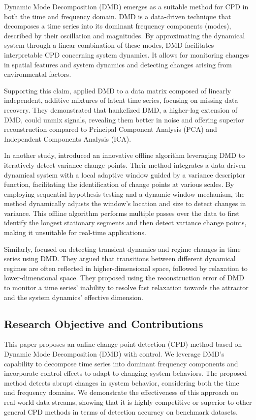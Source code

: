 Dynamic Mode Decomposition (DMD) emerges as a suitable method for CPD in both the time and frequency domain. DMD is a data-driven technique that decomposes a time series into its dominant frequency components (modes), described by their oscillation and magnitudes. By approximating the dynamical system through a linear combination of these modes, DMD facilitates interpretable CPD concerning system dynamics. It allows for monitoring changes in spatial features and system dynamics and detecting changes arising from environmental factors.

Supporting this claim, \citet{Prasadan2020} applied DMD to a data matrix composed of linearly independent, additive mixtures of latent time series, focusing on missing data recovery. They demonstrated that hankelized DMD, a higher-lag extension of DMD, could unmix signals, revealing them better in noise and offering superior reconstruction compared to Principal Component Analysis (PCA) and Independent Components Analysis (ICA).

In another study, \citet{Srivastava2017} introduced an innovative offline algorithm leveraging DMD to iteratively detect variance change points. Their method integrates a data-driven dynamical system with a local adaptive window guided by a variance descriptor function, facilitating the identification of change points at various scales. By employing sequential hypothesis testing and a dynamic window mechanism, the method dynamically adjusts the window's location and size to detect changes in variance. This offline algorithm performs multiple passes over the data to first identify the longest stationary segments and then detect variance change points, making it unsuitable for real-time applications.

Similarly, \citet{Gottwald2020} focused on detecting transient dynamics and regime changes in time series using DMD. They argued that transitions between different dynamical regimes are often reflected in higher-dimensional space, followed by relaxation to lower-dimensional space. They proposed using the reconstruction error of DMD to monitor a time series' inability to resolve fast relaxation towards the attractor and the system dynamics' effective dimension.

\subsection{Research Objective and Contributions}
This paper proposes an online change-point detection (CPD) method based on Dynamic Mode Decomposition (DMD) with control. We leverage DMD's capability to decompose time series into dominant frequency components and incorporate control effects to adapt to changing system behaviors. The proposed method detects abrupt changes in system behavior, considering both the time and frequency domains. We demonstrate the effectiveness of this approach on real-world data streams, showing that it is highly competitive or superior to other general CPD methods in terms of detection accuracy on benchmark datasets.

